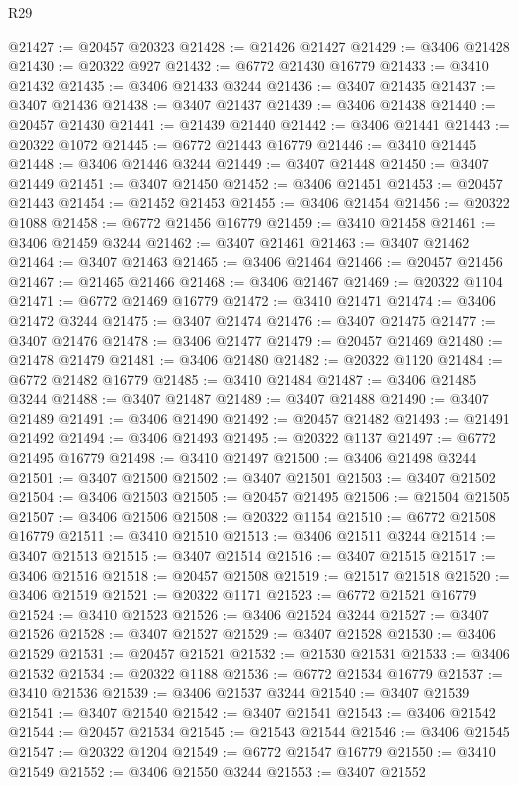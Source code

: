 \begin{lexlean}{R29}
\begin{coremodule}
@21427 := @20457 @20323
@21428 := @21426 @21427
@21429 := @3406 @21428
@21430 := @20322 @927
@21432 := @6772 @21430 @16779
@21433 := @3410 @21432
@21435 := @3406 @21433 @3244
@21436 := @3407 @21435
@21437 := @3407 @21436
@21438 := @3407 @21437
@21439 := @3406 @21438
@21440 := @20457 @21430
@21441 := @21439 @21440
@21442 := @3406 @21441
@21443 := @20322 @1072
@21445 := @6772 @21443 @16779
@21446 := @3410 @21445
@21448 := @3406 @21446 @3244
@21449 := @3407 @21448
@21450 := @3407 @21449
@21451 := @3407 @21450
@21452 := @3406 @21451
@21453 := @20457 @21443
@21454 := @21452 @21453
@21455 := @3406 @21454
@21456 := @20322 @1088
@21458 := @6772 @21456 @16779
@21459 := @3410 @21458
@21461 := @3406 @21459 @3244
@21462 := @3407 @21461
@21463 := @3407 @21462
@21464 := @3407 @21463
@21465 := @3406 @21464
@21466 := @20457 @21456
@21467 := @21465 @21466
@21468 := @3406 @21467
@21469 := @20322 @1104
@21471 := @6772 @21469 @16779
@21472 := @3410 @21471
@21474 := @3406 @21472 @3244
@21475 := @3407 @21474
@21476 := @3407 @21475
@21477 := @3407 @21476
@21478 := @3406 @21477
@21479 := @20457 @21469
@21480 := @21478 @21479
@21481 := @3406 @21480
@21482 := @20322 @1120
@21484 := @6772 @21482 @16779
@21485 := @3410 @21484
@21487 := @3406 @21485 @3244
@21488 := @3407 @21487
@21489 := @3407 @21488
@21490 := @3407 @21489
@21491 := @3406 @21490
@21492 := @20457 @21482
@21493 := @21491 @21492
@21494 := @3406 @21493
@21495 := @20322 @1137
@21497 := @6772 @21495 @16779
@21498 := @3410 @21497
@21500 := @3406 @21498 @3244
@21501 := @3407 @21500
@21502 := @3407 @21501
@21503 := @3407 @21502
@21504 := @3406 @21503
@21505 := @20457 @21495
@21506 := @21504 @21505
@21507 := @3406 @21506
@21508 := @20322 @1154
@21510 := @6772 @21508 @16779
@21511 := @3410 @21510
@21513 := @3406 @21511 @3244
@21514 := @3407 @21513
@21515 := @3407 @21514
@21516 := @3407 @21515
@21517 := @3406 @21516
@21518 := @20457 @21508
@21519 := @21517 @21518
@21520 := @3406 @21519
@21521 := @20322 @1171
@21523 := @6772 @21521 @16779
@21524 := @3410 @21523
@21526 := @3406 @21524 @3244
@21527 := @3407 @21526
@21528 := @3407 @21527
@21529 := @3407 @21528
@21530 := @3406 @21529
@21531 := @20457 @21521
@21532 := @21530 @21531
@21533 := @3406 @21532
@21534 := @20322 @1188
@21536 := @6772 @21534 @16779
@21537 := @3410 @21536
@21539 := @3406 @21537 @3244
@21540 := @3407 @21539
@21541 := @3407 @21540
@21542 := @3407 @21541
@21543 := @3406 @21542
@21544 := @20457 @21534
@21545 := @21543 @21544
@21546 := @3406 @21545
@21547 := @20322 @1204
@21549 := @6772 @21547 @16779
@21550 := @3410 @21549
@21552 := @3406 @21550 @3244
@21553 := @3407 @21552

\end{coremodule}
\end{lexlean}
